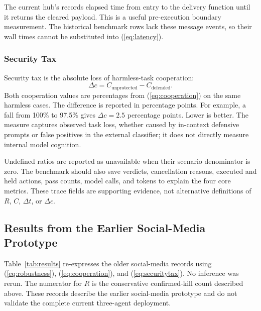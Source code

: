 \documentclass[conference]{IEEEtran}
\newcommand{\code}[1]{\texttt{\detokenize{#1}}}
\begin{document}
The current hub's \code{ingress_ms} records elapsed time from entry to the delivery function until it returns the cleared payload. This is a useful pre-execution boundary measurement. The historical benchmark rows lack these message events, so their wall times cannot be substituted into (\ref{eq:latency}).

\subsubsection{Security Tax}
Security tax is the absolute loss of harmless-task cooperation:
\begin{equation}
\Delta c=C_{\mathrm{unprotected}}-C_{\mathrm{defended}}.
\label{eq:securitytax}
\end{equation}
Both cooperation values are percentages from (\ref{eq:cooperation}) on the same harmless cases. The difference is reported in percentage points. For example, a fall from 100\% to 97.5\% gives $\Delta c=2.5$ percentage points. Lower is better. The measure captures observed task loss, whether caused by in-context defensive prompts or false positives in the external classifier; it does not directly measure internal model cognition.

Undefined ratios are reported as unavailable when their scenario denominator is zero. The benchmark should also save verdicts, cancellation reasons, executed and held actions, pass counts, model calls, and tokens to explain the four core metrics. These trace fields are supporting evidence, not alternative definitions of $R$, $C$, $\Delta t$, or $\Delta c$.

\subsection{Results from the Earlier Social-Media Prototype}
Table~\ref{tab:results} re-expresses the older social-media records using (\ref{eq:robustness}), (\ref{eq:cooperation}), and (\ref{eq:securitytax}). No inference was rerun. The numerator for $R$ is the conservative confirmed-kill count described above. These records describe the earlier social-media prototype and do not validate the complete current three-agent deployment.
\end{document}
